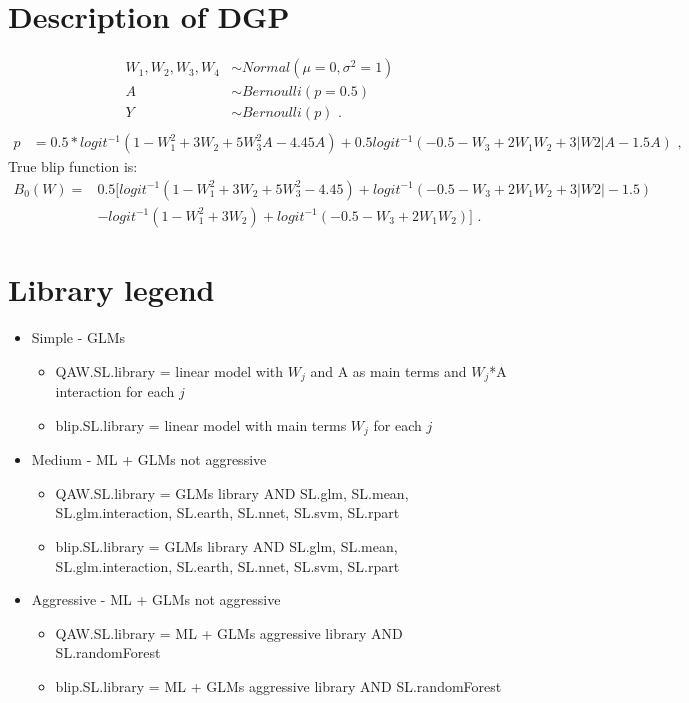 \documentclass[11pt]{article}\usepackage[]{graphicx}\usepackage[]{color}
\begin{document}
\section{Description of DGP}

\begin{align*}
W_1,W_2,W_3,W_4 &\sim Normal(\mu=0,\sigma^2=1) \\
A &\sim Bernoulli(p=0.5) \\
Y &\sim Bernoulli(p) \text{ .}\\
\end{align*}
\begin{align*}
p &= 0.5*logit^{-1} (1-W_1^2  + 3W_2  + 5W_3^2 A - 4.45A)+0.5logit^{-1} (-0.5- W_3  + 2W_1 W_2  + 3|W2|A - 1.5A) \text{ ,}
\end{align*}
True blip function is:
\begin{align*}
B_0 (W)= & 0.5[logit^{-1} (1-W_1^2  + 3W_2  + 5W_3^2  - 4.45)+logit^{-1} (-0.5- W_3  + 2W_1 W_2  + 3|W2|  - 1.5)\\
& - logit^{-1} (1-W_1^2  + 3W_2 )+logit^{-1} (-0.5- W_3  + 2W_1 W_2 )] \text{ .}
\end{align*}


\section{Library legend}

\begin{itemize}
\item Simple - GLMs
\begin{itemize}
\item QAW.SL.library = linear model with $W_j$ and A as main terms and $W_j$*A interaction for each $j$
\item blip.SL.library = linear model with main terms $W_j$ for each $j$
\end{itemize}
\item Medium - ML + GLMs not aggressive
\begin{itemize}
\item QAW.SL.library = GLMs library AND SL.glm, SL.mean, SL.glm.interaction, SL.earth, SL.nnet, SL.svm, SL.rpart
\item blip.SL.library = GLMs library AND SL.glm, SL.mean, SL.glm.interaction, SL.earth, SL.nnet, SL.svm, SL.rpart
\end{itemize}
\item Aggressive - ML + GLMs not aggressive
\begin{itemize}
\item QAW.SL.library = ML + GLMs aggressive library AND SL.randomForest
\item blip.SL.library = ML + GLMs aggressive library AND SL.randomForest
\end{itemize}
\end{itemize}
\end{document}
